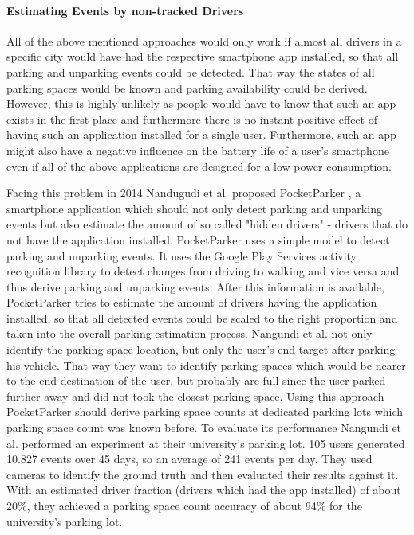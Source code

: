 \paragraph{Estimating Events by non-tracked Drivers}

All of the above mentioned approaches would only work if almost all drivers in a specific city would have had the respective smartphone app installed, so that all parking and unparking events could be detected. That way the states of all parking spaces would be known and parking availability could be derived. However, this is highly unlikely as people would have to know that such an app exists in the first place and furthermore there is no instant positive effect of having such an application installed for a single user. Furthermore, such an app might also have a negative influence on the battery life of a user's smartphone even if all of the above applications are designed for a low power consumption. 

Facing this problem in 2014 Nandugudi et al. proposed PocketParker \cite{Nandugudi:2014:PPP:2632048.2632098}, a smartphone application which should not only detect parking and unparking events but also estimate the amount of so called "hidden drivers" - drivers that do not have the application installed. PocketParker uses a simple model to detect parking and unparking events. It uses the Google Play Services activity recognition library to detect changes from driving to walking and vice versa and thus derive parking and unparking events. After this information is available, PocketParker tries to estimate the amount of drivers having the application installed, so that all detected events could be scaled to the right proportion and taken into the overall parking estimation process. Nangundi et al. not only identify the parking space location, but only the user's end target after parking his vehicle. That way they want to identify parking spaces which would be nearer to the end destination of the user, but probably are full since the user parked further away and did not took the closest parking space. Using this approach PocketParker should derive parking space counts at dedicated parking lots which parking space count was known before. To evaluate its performance Nangundi et al. performed an experiment at their university's parking lot. 105 users generated 10.827 events over 45 days, so an average of 241 events per day. They used cameras to identify the ground truth and then evaluated their results against it. With an estimated driver fraction (drivers which had the app installed) of about 20\%, they achieved a parking space count accuracy of about 94\% for the university's parking lot.


